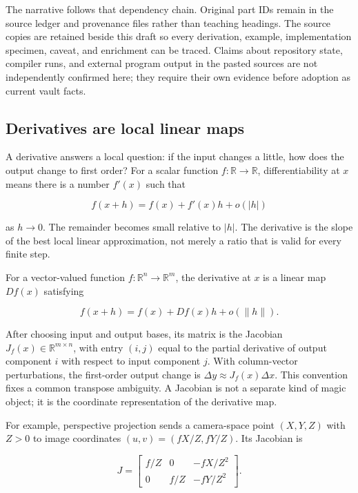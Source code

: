 The narrative follows that dependency chain. Original part IDs remain in the source ledger and provenance files rather than teaching headings. The source copies are retained beside this draft so every derivation, example, implementation specimen, caveat, and enrichment can be traced. Claims about repository state, compiler runs, and external program output in the pasted sources are not independently confirmed here; they require their own evidence before adoption as current vault facts.

\subsection{Derivatives are local linear maps}\label{01-foundations-i-ch020-derivatives-are-local-linear-maps}

A derivative answers a local question: if the input changes a little, how does the output change to first order? For a scalar function \(f:\mathbb R\to\mathbb R\), differentiability at \(x\) means there is a number \(f'(x)\) such that

\[
f(x+h)=f(x)+f'(x)h+o(|h|)
\]

as \(h\to0\). The remainder becomes small relative to \(|h|\). The derivative is the slope of the best local linear approximation, not merely a ratio that is valid for every finite step.

For a vector-valued function \(f:\mathbb R^n\to\mathbb R^m\), the derivative at \(x\) is a linear map \(Df(x)\) satisfying

\[
f(x+h)=f(x)+Df(x)h+o(\|h\|).
\]

After choosing input and output bases, its matrix is the Jacobian \(J_f(x)\in\mathbb R^{m\times n}\), with entry \((i,j)\) equal to the partial derivative of output component \(i\) with respect to input component \(j\). With column-vector perturbations, the first-order output change is \(\Delta y\approx J_f(x)\Delta x\). This convention fixes a common transpose ambiguity. A Jacobian is not a separate kind of magic object; it is the coordinate representation of the derivative map.

For example, perspective projection sends a camera-space point \((X,Y,Z)\) with \(Z>0\) to image coordinates \((u,v)=(fX/Z,fY/Z)\). Its Jacobian is

\[
J=\begin{bmatrix}
f/Z & 0 & -fX/Z^2\\
0 & f/Z & -fY/Z^2
\end{bmatrix}.
\]

